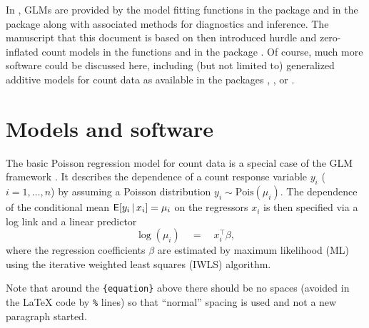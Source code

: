 \documentclass[article]{jss}
\newcommand{\fct}[1]{\code{#1()}}
\begin{document}
In  \citep{R}, GLMs are provided by the model fitting functions
\fct{glm} in the  package and \fct{glm.nb} in the  package
\citep[][Chapter~7.4]{Venables+Ripley:2002} along with associated methods for
diagnostics and inference. The manuscript that this document is based on
\citep{Zeileis+Kleiber+Jackman:2008} then introduced hurdle and zero-inflated
count models in the functions \fct{hurdle} and \fct{zeroinfl} in the 
package \citep{Jackman:2015}. Of course, much more software could be discussed
here, including (but not limited to) generalized additive models for count data
as available in the  packages  \cite{Wood:2006},
 \citep{Stasinopoulos+Rigby:2007}, or  \citep{Yee:2009}.




\section{Models and software} \label{sec:models}

The basic Poisson regression model for count data is a special case of the GLM
framework \cite{McCullagh+Nelder:1989}. It describes the dependence of a count
response variable $y_i$ ($i = 1, \dots, n$) by assuming a Poisson distribution
$y_i \sim \mathrm{Pois}(\mu_i)$. The dependence of the conditional mean
$\mathsf{E}[y_i \, | \, x_i] = \mu_i$ on the regressors $x_i$ is then specified via a
log link and a linear predictor
%
\begin{equation} \label{eq:mean}
\log(\mu_i) \quad = \quad x_i^\top \beta,
\end{equation}
%
where the regression coefficients $\beta$ are estimated by maximum likelihood
(ML) using the iterative weighted least squares (IWLS) algorithm.

\begin{leftbar}
Note that around the \verb|{equation}| above there should be no spaces (avoided
in the {\LaTeX} code by \verb|%| lines) so that ``normal'' spacing is used and
not a new paragraph started.
\end{leftbar}
\end{document}

